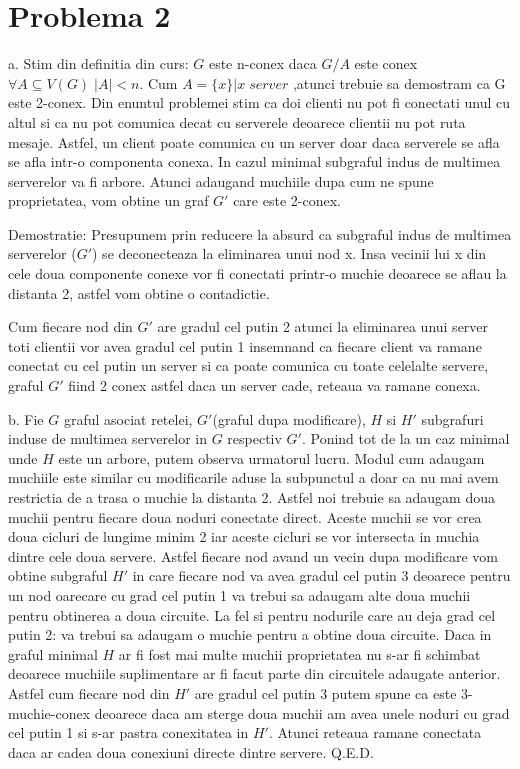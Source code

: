\documentclass[11pt,leqno]{article}
\begin{document}
%

\section*{Problema 2}
    a. Stim din definitia din curs: $G$ este n-conex daca $ G / A $ este conex $ \forall A \subseteq V(G) \; |A| < n $.
Cum $ A = \{x\} | x \; server $ ,atunci trebuie sa demostram ca G este 2-conex. 
Din enuntul problemei stim ca doi clienti nu pot fi conectati unul cu altul si ca nu pot comunica decat cu serverele deoarece clientii nu pot ruta mesaje.
Astfel, un client poate comunica cu un server doar daca serverele se afla se afla intr-o componenta conexa. In cazul minimal subgraful indus de multimea serverelor va fi arbore.
Atunci adaugand muchiile dupa cum ne spune proprietatea, vom obtine un graf $G'$ care este 2-conex. 

    Demostratie: Presupunem prin reducere la absurd ca subgraful indus de multimea serverelor ($G'$) se deconecteaza la eliminarea unui nod x. Insa vecinii lui x din cele doua componente conexe vor fi conectati printr-o muchie deoarece se aflau la distanta 2, astfel vom obtine o contadictie. 
    
    Cum fiecare nod din $G'$ are gradul cel putin 2 atunci la eliminarea unui server toti clientii vor avea gradul cel putin 1 insemnand ca fiecare client va ramane conectat cu cel putin un server si ca poate comunica cu toate celelalte servere,
    graful $G'$ fiind 2 conex astfel daca un server cade, reteaua va ramane conexa.

    b. Fie $G$ graful asociat retelei, $G'$(graful dupa modificare), $H$ si $H'$ subgrafuri induse de multimea serverelor in $G$ respectiv $G'$. Ponind tot de la un caz minimal unde $H$ este un arbore, putem observa urmatorul lucru.
Modul cum adaugam muchiile este similar cu modificarile aduse la subpunctul a doar ca nu mai avem restrictia de a trasa o muchie la distanta 2. Astfel noi trebuie sa adaugam doua muchii pentru fiecare doua noduri conectate direct. Aceste muchii se vor crea doua cicluri de lungime minim 2 iar aceste cicluri se vor intersecta in muchia dintre cele doua servere.
Astfel fiecare nod avand un vecin dupa modificare vom obtine subgraful $H'$ in care fiecare nod va avea gradul cel putin 3 deoarece pentru un nod oarecare cu grad cel putin 1 va trebui sa adaugam alte doua muchii pentru obtinerea a doua circuite. La fel si pentru nodurile care au deja grad cel putin 2: va trebui sa adaugam o muchie pentru a obtine doua circuite. Daca in graful minimal $H$ ar fi fost mai multe muchii proprietatea nu s-ar fi schimbat deoarece muchiile suplimentare ar fi facut parte din circuitele adaugate anterior.
Astfel cum fiecare nod din $H'$ are gradul cel putin 3 putem spune ca este 3-muchie-conex deoarece daca am sterge doua muchii am avea unele noduri cu grad cel putin 1 si s-ar pastra conexitatea in $H'$. Atunci reteaua ramane conectata daca ar cadea doua conexiuni directe dintre servere. Q.E.D. 
\end{document}
